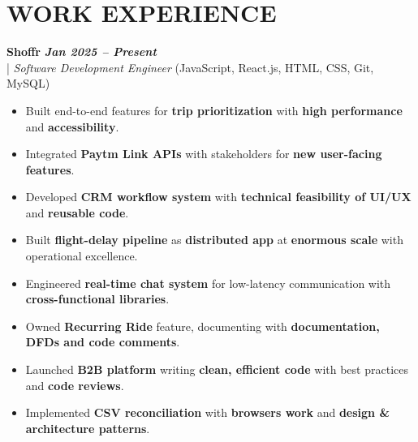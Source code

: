 \documentclass[10pt,a4paper]{article}
\begin{document}

\section*{WORK EXPERIENCE}
\small

\noindent
  \textbf{Shoffr} \hfill \textit{\textbf{Jan 2025 -- Present}} \\
  \;|\;
  \textit{Software Development Engineer} (JavaScript, React.js, HTML, CSS, Git, MySQL)
\begin{itemize}



\item Built end-to-end features for \textbf{trip prioritization} with \textbf{high performance} and \textbf{accessibility}.



\item Integrated \textbf{Paytm Link APIs} with stakeholders for \textbf{new user-facing features}.



\item Developed \textbf{CRM workflow system} with \textbf{technical feasibility of UI/UX} and \textbf{reusable code}.



\item Built \textbf{flight-delay pipeline} as \textbf{distributed app} at \textbf{enormous scale} with operational excellence.



\item Engineered \textbf{real-time chat system} for low-latency communication with \textbf{cross-functional libraries}.



\item Owned \textbf{Recurring Ride} feature, documenting with \textbf{documentation, DFDs and code comments}.



\item Launched \textbf{B2B platform} writing \textbf{clean, efficient code} with best practices and \textbf{code reviews}.



\item Implemented \textbf{CSV reconciliation} with \textbf{browsers work} and \textbf{design \& architecture patterns}.



\end{itemize}
\end{document}
